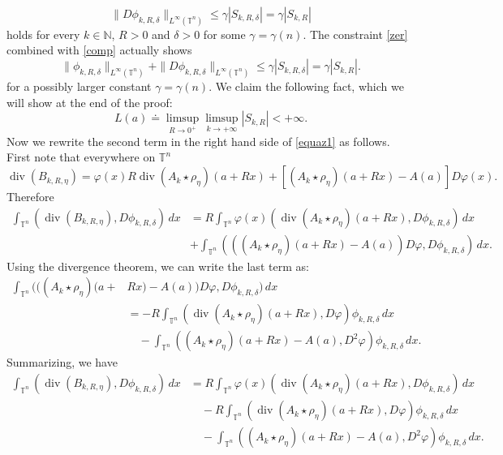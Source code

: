 \documentclass[10pt,reqno]{amsart}
\numberwithin{equation}{section}
\newcommand{\T}{\mathbb{T}}
\newcommand{\N}{\mathbb{N}}
\DeclareMathOperator{\dv}{div}
\theoremstyle{plain}
\theoremstyle{definition}
\theoremstyle{remark}
\begin{document}
\begin{equation}\label{comp}
\|D \phi_{k,R,\delta}\|_{L^\infty(\T^n)} \le \gamma|S_{k,R,\delta}| = \gamma |S_{k,R} |
\end{equation}
holds for every $k \in \N$, $R >0$ and $\delta > 0$ for some $\gamma = \gamma(n)$.  The constraint \eqref{zer} combined with \eqref{comp} actually shows
\begin{equation}\label{comp1}
\|\phi_{k,R,\delta}\|_{L^\infty(\T^n)} +\|D \phi_{k,R,\delta}\|_{L^\infty(\T^n)} \le \gamma |S_{k,R,\delta} | = \gamma |S_{k,R}|.
\end{equation}
for a possibly larger constant $\gamma = \gamma(n)$. We claim the following fact, which we will show at the end of the proof:
\begin{equation}\label{imp}
L(a) \doteq \limsup_{R\to 0^+}\limsup_{k \to +\infty} |S_{k,R} | < + \infty.
\end{equation}
Now we rewrite the second term in the right hand side of \eqref{equaz1} as follows. First note that everywhere on $\T^n$
\[
\dv(B_{k,R,\eta}) = \varphi(x)R\dv(A_k\star \rho_\eta)(a + Rx) + [(A_k\star \rho_\eta)(a + Rx) -A(a)]D\varphi(x).
\]
Therefore
\begin{align*}
\int_{\T^n}(\dv(B_{k,R,\eta}),D\phi_{k,R,\delta})\,dx &= R\int_{\T^n}\varphi(x)(\dv(A_k \star \rho_\eta)(a + Rx),D\phi_{k,R,\delta})\,dx \\
&+ \int_{\T^n}(((A_k\star \rho_\eta)(a + Rx) -A(a))D\varphi,D\phi_{k,R,\delta})\,dx.
\end{align*}
Using the divergence theorem, we can write the last term as:
\begin{align*}
\int_{\T^n}(((A_k\star \rho_\eta)(a + &Rx)  -A(a))D\varphi,D\phi_{k,R,\delta})\,dx \\
&=-R\int_{\T^n}(\dv (A_k\star \rho_\eta)(a + Rx), D\varphi)\phi_{k,R,\delta}\,dx \\
&\quad-\int_{\T^n}((A_k\star \rho_\eta)(a + Rx) -A(a),D^2\varphi) \phi_{k,R,\delta}\,dx.
\end{align*}
Summarizing, we have
\begin{align*}
\int_{\T^n}(\dv(B_{k,R,\eta}),D\phi_{k,R,\delta})\,dx &= R\int_{\T^n}\varphi(x)(\dv(A_k\star \rho_\eta)(a + Rx),D\phi_{k,R,\delta})\,dx   \\
&\quad-R\int_{\T^n}(\dv (A_k\star \rho_\eta)(a + Rx), D\varphi)\phi_{k,R,\delta}\,dx\\
&\quad-\int_{\T^n}((A_k\star \rho_\eta)(a + Rx)-A(a),D^2\varphi) \phi_{k,R,\delta}\,dx.
\end{align*}
\end{document}
